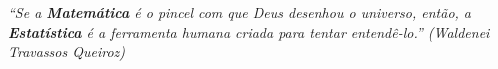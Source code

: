 
\begin{epigrafe}
\vspace{3cm}


\begin{minipage}{10cm}

\textit{``Se a \textbf{Matemática} é o pincel com que Deus desenhou o universo, então, a \textbf{Estatística} é a ferramenta humana criada para tentar entendê-lo.'' (Waldenei Travassos Queiroz)}

\end{minipage}



\end{epigrafe}




